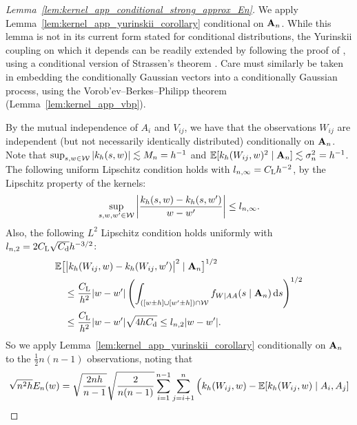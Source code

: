 \begin{proof}[Lemma~\ref{lem:kernel_app_conditional_strong_approx_En}]

  We apply Lemma~\ref{lem:kernel_app_yurinskii_corollary} conditional on
  $\mathbf{A}_n$. While this lemma is not in its current form
  stated for conditional distributions,
  the Yurinskii coupling on which it depends can be readily extended
  by following the proof of \citet[Lemma~38]{belloni2019conditional},
  using a conditional version of Strassen's theorem
  \cite[Theorem~B.2]{chen2020jackknife}.
  Care must similarly be taken in embedding the conditionally Gaussian vectors
  into a conditionally Gaussian process, using the
  Vorob'ev--Berkes--Philipp theorem (Lemma~\ref{lem:kernel_app_vbp}).

  By the mutual independence of $A_i$ and $V_{i j}$,
  we have that the observations
  $W_{i j}$ are independent
  (but not necessarily identically distributed)
  conditionally on $\mathbf{A}_n$.
  Note that
  $\sup_{s,w \in \mathcal{W}} |k_h(s,w)| \lesssim M_n = h^{-1}$
  and
  $\mathbb{E}[k_h(W_{i j},w)^2 \mid \mathbf{A}_n] \lesssim \sigma_n^2 = h^{-1}$.
  The following uniform Lipschitz condition holds
  with $l_{n,\infty} = C_{\mathrm{L}} h^{-2}$,
  by the Lipschitz property of the kernels:
  \begin{align*}
    \sup_{s,w,w' \in \mathcal{W}}
    \left|
    \frac{k_h(s, w) - k_h(s, w')}
    {w-w'}
    \right|
    \leq
    l_{n,\infty}.
  \end{align*}
  Also, the following $L^2$ Lipschitz condition holds
  uniformly with $l_{n,2} = 2 C_{\mathrm{L}} \sqrt{C_{\mathrm{d}}} h^{-3/2}$:
  \begin{align*}
    &\mathbb{E}\big[
      \big|
      k_h(W_{i j}, w) - k_h(W_{i j}, w')
      \big|^2
      \mid \mathbf{A}_n
    \big]^{1/2} \\
    &\quad\leq
    \frac{C_{\mathrm{L}}}{h^2}
    |w-w'|
    \left(
      \int_{([w \pm h] \cup [w' \pm h]) \cap \mathcal{W}}
      f_{W \mid AA}(s \mid  \mathbf{A}_n)
      \,\mathrm{d}s
    \right)^{1/2} \\
    &\quad\leq
    \frac{C_{\mathrm{L}}}{h^2}
    |w-w'|
    \sqrt{4h C_{\mathrm{d}}}
    \leq
    l_{n,2}
    |w-w'|.
  \end{align*}
  So we apply
  Lemma~\ref{lem:kernel_app_yurinskii_corollary}
  conditionally on $\mathbf{A}_n$
  to the $\frac{1}{2}n(n-1)$ observations,
  noting that
  \begin{align*}
    \sqrt{n^2h} E_n(w)
    =
    \sqrt{\frac{2 n h}{n-1}}
    \sqrt{\frac{2}{n(n-1)}}
    \sum_{i=1}^{n-1}
    \sum_{j=i+1}^{n}
    \Big(
      k_h(W_{i j},w)
      - \E[k_h(W_{i j},w)  \mid  A_i, A_j]

\end{align*}
\end{proof}
